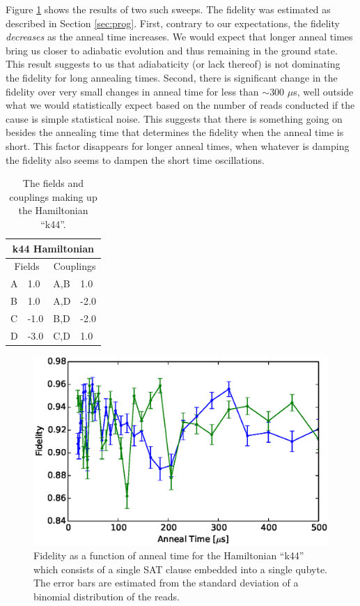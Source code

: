 Figure \ref{fig:k44_comparison} shows the results of two such sweeps.  The fidelity was estimated as described in Section \ref{sec:prog}.  First, contrary to our expectations, the fidelity \emph{decreases} as the anneal time increases.  We would expect that longer anneal times bring us closer to adiabatic evolution and thus remaining in the ground state.  This result suggests to us that adiabaticity (or lack thereof) is not dominating the fidelity for long annealing times. 
Second, there is significant change in the fidelity over very small changes in anneal time for less than $\sim 300$ $\mu$s, well outside what we would statistically expect based on the number of reads conducted if the cause is simple statistical noise.  This suggests that there is something going on besides the annealing time that determines the fidelity when the anneal time is short.  This factor disappears for longer anneal times, when whatever is damping the fidelity also seems to dampen the short time oscillations.
\begin{table}
	\begin{center}
\begin{tabular}{ | l | l | l | l |}
	\hline
	\multicolumn{4}{|c|}{k44 Hamiltonian} \\ \hline
	\multicolumn{2}{|c|}{Fields} & \multicolumn{2}{c|}{Couplings} \\ \hline
	A & 1.0 & A,B & 1.0 \\
	B & 1.0 & A,D & -2.0 \\
	C & -1.0 & B,D & -2.0 \\
	D & -3.0 & C,D & 1.0 \\ \hline
\end{tabular}
\end{center}
\caption[k44 Hamiltonian]{The fields and couplings making up the Hamiltonian ``k44''.}
\label{tab:k44}
\end{table}

\begin{figure}
	\includegraphics{img/k44.eps}
	\caption[Single K44 Fidelity]{Fidelity as a function of anneal time for the Hamiltonian ``k44'' which consists of a single SAT clause embedded into a single qubyte.  The error bars are estimated from the standard deviation of a binomial distribution of the reads.}
	\label{fig:k44_comparison}
\end{figure}


